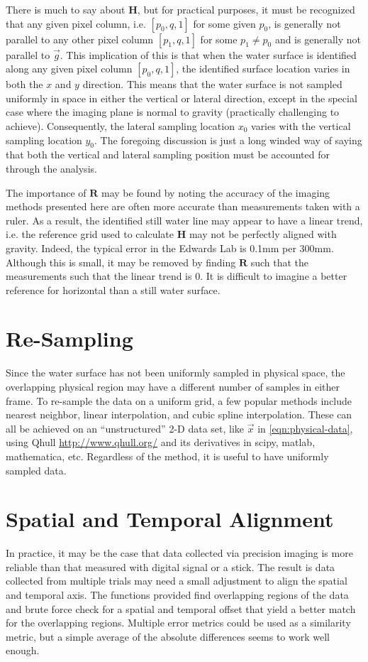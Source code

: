 There is much to say about $\boldsymbol{H}$, but for practical purposes, it must be recognized that any given pixel column, i.e. $[p_0,q,1]$ for some given $p_0$, is generally not parallel to any other pixel column $[p_1,q,1]$ for some $p_1 \neq p_0$ and is generally not parallel to $\vec{g}$.
This implication of this is that when the water surface is identified along any given pixel column $[p_0,q,1]$, the identified surface location varies in both the $x$ and $y$ direction.
This means that the water surface is not sampled uniformly in space in either the vertical or lateral direction, except in the special case where the imaging plane is normal to gravity (practically challenging to achieve).
Consequently, the lateral sampling location $x_0$ varies with the vertical sampling location $y_0$.
The foregoing discussion is just a long winded way of saying that both the vertical and lateral sampling position must be accounted for through the analysis. \par
The importance of $\boldsymbol{R}$ may be found by noting the accuracy of the imaging methods presented here are often more accurate than measurements taken with a ruler.
As a result, the identified still water line may appear to have a linear trend, i.e. the reference grid used to calculate $\boldsymbol{H}$ may not be perfectly aligned with gravity.
Indeed, the typical error in the Edwards Lab is 0.1mm per 300mm.
Although this is small, it may be removed by finding $\boldsymbol{R}$ such that the measurements such that the linear trend is 0.
It is difficult to imagine a better reference for horizontal than a still water surface.
%
\section{Re-Sampling}
%
Since the water surface has not been uniformly sampled in physical space, the overlapping physical region may have a different number of samples in either frame.
To re-sample the data on a uniform grid, a few popular methods include nearest neighbor, linear interpolation, and cubic spline interpolation.
These can all be achieved on an ``unstructured'' 2-D data set, like $\vec{x}$ in \eqref{eqn:physical-data}, using Qhull \url{http://www.qhull.org/} and its derivatives in scipy, matlab, mathematica, etc.
Regardless of the method, it is useful to have uniformly sampled data.
%
\section{Spatial and Temporal Alignment}
%
In practice, it may be the case that data collected via precision imaging is more reliable than that measured with digital signal or a stick.
The result is data collected from multiple trials may need a small adjustment to align the spatial and temporal axis.
The functions provided find overlapping regions of the data and brute force check for a spatial and temporal offset that yield a better match for the overlapping regions.
Multiple error metrics could be used as a similarity metric, but a simple average of the absolute differences seems to work well enough.
%
